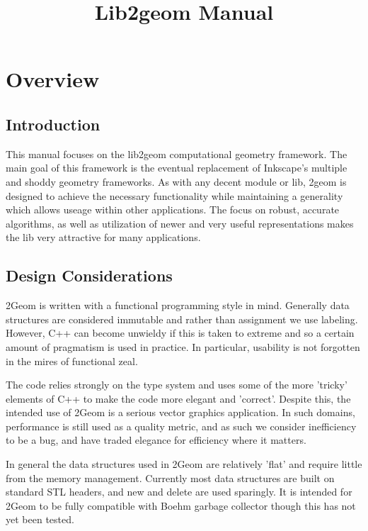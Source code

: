 \documentclass[openany]{book}
\title{Lib2geom Manual}
\begin{document}
\maketitle{}

\chapter{Overview}

\section{Introduction}

This manual focuses on the lib2geom computational geometry framework.
The main goal of this framework is the eventual replacement of
Inkscape's multiple and shoddy geometry frameworks. As with any decent
module or lib, 2geom is designed to achieve the necessary functionality
while maintaining a generality which allows useage within other
applications.  The focus on robust, accurate algorithms, as well as
utilization of newer and very useful representations makes the lib
very attractive for many applications.

\section{Design Considerations}
2Geom is written with a functional programming style in mind.
Generally data structures are considered immutable and rather than
assignment we use labeling.  However, C++ can become unwieldy if
this is taken to extreme and so a certain amount of pragmatism is
used in practice.  In particular, usability is not forgotten in the
mires of functional zeal.

The code relies strongly on the type system and uses some of the more
'tricky' elements of C++ to make the code more elegant and 'correct'.
Despite this, the intended use of 2Geom is a serious vector graphics
application. In such domains, performance is still used as a quality
metric, and as such we consider inefficiency to be a bug, and have
traded elegance for efficiency where it matters.

In general the data structures used in 2Geom are relatively 'flat'
and require little from the memory management.  Currently most data
structures are built on standard STL headers\cite{stl}, and new and
delete are used sparingly.  It is intended for 2Geom to be fully
compatible with Boehm garbage collector\cite{boehm} though this has
not yet been tested.
\end{document}
